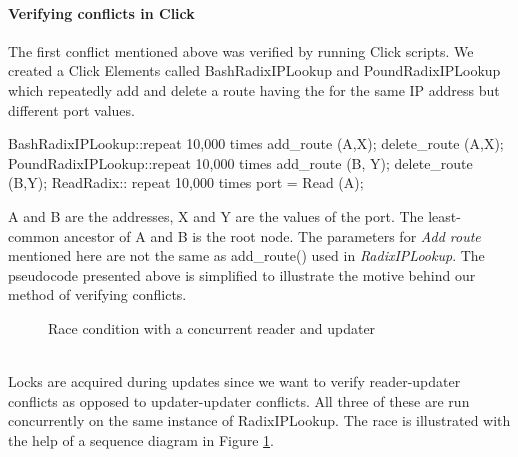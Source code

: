 \documentclass[a4paper,marginparwidth=50pt,marginparsep=10pt]{article}
\begin{document}
\paragraph{Verifying conflicts in Click}
The first conflict mentioned above was verified by running Click scripts.
We created a Click Elements called BashRadixIPLookup and PoundRadixIPLookup which repeatedly add and delete a route having the for the same IP address but different port values.
\begin{code}
  BashRadixIPLookup::repeat 10,000 times {
    add_route (A,X);
    delete_route (A,X);
  }
  PoundRadixIPLookup::repeat 10,000 times {
    add_route (B, Y);
    delete_route (B,Y);
  } 
  ReadRadix:: repeat 10,000 times {
    port = Read (A);
  }
\end{code}
A and B are the addresses, X and Y are the values of the port. The least-common ancestor of A and B is the root node. The parameters for \emph{Add route} mentioned here are not the same as add\_route() used in \emph{RadixIPLookup}. The pseudocode presented above is simplified to illustrate the motive behind our method of verifying conflicts.
\begin{figure}[tph]
\caption{Race condition with a concurrent reader and updater}
\label{race_readerfigure}
\end{figure}
\\
Locks are acquired during updates since we want to verify reader-updater conflicts as opposed to updater-updater conflicts. All three of these are run concurrently on the same instance of RadixIPLookup. The race is illustrated with the help of a sequence diagram in Figure \ref{race_readerfigure}.\\
\end{document}

